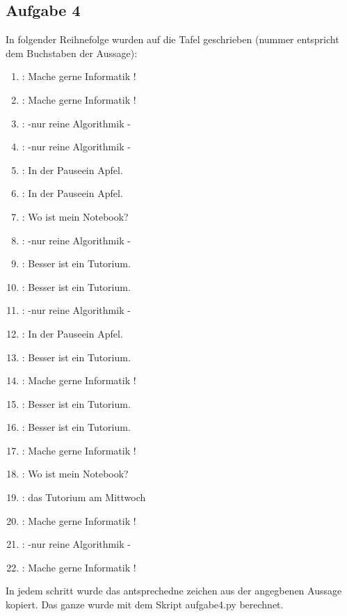 \subsection*{Aufgabe 4}
In folgender Reihnefolge wurden auf die Tafel geschrieben (nummer entspricht dem Buchstaben der Aussage):

\begin{enumerate}
\item : Mache gerne Informatik !
\item : Mache gerne Informatik !
\item : -nur reine Algorithmik -
\item : -nur reine Algorithmik -
\item : In der Pauseein Apfel.
\item : In der Pauseein Apfel.
\item : Wo ist mein Notebook?
\item : -nur reine Algorithmik -
\item : Besser ist ein Tutorium.
\item : Besser ist ein Tutorium.
\item : -nur reine Algorithmik -
\item : In der Pauseein Apfel.
\item : Besser ist ein Tutorium.
\item : Mache gerne Informatik !
\item : Besser ist ein Tutorium.
\item : Besser ist ein Tutorium.
\item : Mache gerne Informatik !
\item : Wo ist mein Notebook?
\item : das Tutorium am Mittwoch
\item : Mache gerne Informatik !
\item : -nur reine Algorithmik -
\item : Mache gerne Informatik !
\end{enumerate}

In jedem schritt wurde das antsprechedne zeichen aus der angegbenen Aussage kopiert. Das ganze wurde mit dem Skript aufgabe4.py berechnet.